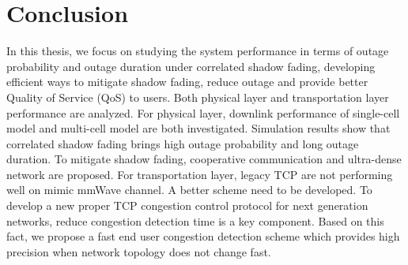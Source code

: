 \chapter{Conclusion}\label{ch:conc}
\par In this thesis, we focus on studying the system performance in terms of outage probability and outage duration under correlated shadow fading, developing efficient ways to mitigate shadow fading, reduce outage and provide better Quality of Service (QoS) to users. Both physical layer and transportation layer performance are analyzed. For physical layer, downlink performance of single-cell model and multi-cell model are both investigated. Simulation results show that correlated shadow fading brings high outage probability and long outage duration. To mitigate shadow fading, cooperative communication and ultra-dense network are proposed. For transportation layer, legacy TCP are not performing well on mimic mmWave channel. A better scheme need to be developed. To develop a new proper TCP congestion control protocol for next generation networks, reduce congestion detection time is a key component. Based on this fact, we propose a fast end user congestion detection scheme which provides high precision when network topology does not change fast.
